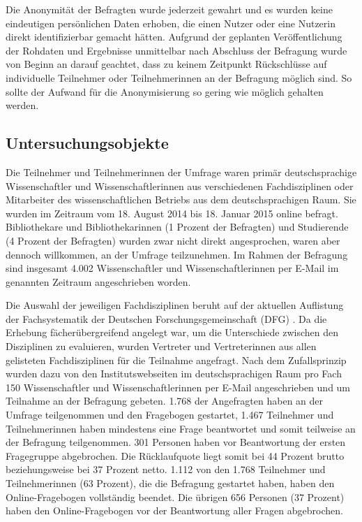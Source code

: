 Die Anonymität der Befragten wurde jederzeit gewahrt und es wurden keine eindeutigen persönlichen Daten erhoben, die einen Nutzer oder eine Nutzerin direkt identifizierbar gemacht hätten. Aufgrund der geplanten Veröffentlichung der Rohdaten und Ergebnisse unmittelbar nach Abschluss der Befragung wurde von Beginn an darauf geachtet, dass zu keinem Zeitpunkt Rückschlüsse auf individuelle Teilnehmer oder Teilnehmerinnen an der Befragung möglich sind. So sollte der Aufwand für die Anonymisierung so gering wie möglich gehalten werden.

\subsection{Untersuchungsobjekte}

Die Teilnehmer und Teilnehmerinnen der Umfrage waren primär deutschsprachige Wissenschaftler und Wissenschaftlerinnen aus verschiedenen Fachdisziplinen oder Mitarbeiter des wissenschaftlichen Betriebs aus dem deutschsprachigen Raum. Sie wurden im Zeitraum vom 18. August 2014 bis 18. Januar 2015 online befragt. Bibliothekare und Bibliothekarinnen (1 Prozent der Befragten) und Studierende (4 Prozent der Befragten) wurden zwar nicht direkt angesprochen, waren aber dennoch willkommen, an der Umfrage teilzunehmen. Im Rahmen der Befragung sind insgesamt 4.002 Wissenschaftler und Wissenschaftlerinnen per E-Mail im genannten Zeitraum angeschrieben worden.

Die Auswahl der jeweiligen Fachdisziplinen beruht auf der aktuellen Auflistung der Fachsystematik der Deutschen Forschungsgemeinschaft (DFG) \cite{DFG_2014b}. Da die Erhebung fächerübergreifend angelegt war, um die Unterschiede zwischen den Disziplinen zu evaluieren, wurden Vertreter und Vertreterinnen aus allen gelisteten Fachdisziplinen für die Teilnahme angefragt. Nach dem Zufallsprinzip wurden dazu von den Institutswebseiten im deutschsprachigen Raum pro Fach 150 Wissenschaftler und Wissenschaftlerinnen per E-Mail angeschrieben und um Teilnahme an der Befragung gebeten. 1.768 der Angefragten haben an der Umfrage teilgenommen und den Fragebogen gestartet, 1.467 Teilnehmer und Teilnehmerinnen haben mindestens eine Frage beantwortet und somit teilweise an der Befragung teilgenommen. 301 Personen haben vor Beantwortung der ersten Fragegruppe abgebrochen. Die Rücklaufquote liegt somit bei 44 Prozent brutto beziehungsweise bei 37 Prozent netto. 1.112 von den 1.768 Teilnehmer und Teilnehmerinnen (63 Prozent), die die Befragung gestartet haben, haben den Online-Fragebogen vollständig beendet. Die übrigen 656 Personen (37 Prozent) haben den Online-Fragebogen vor der Beantwortung aller Fragen abgebrochen.

